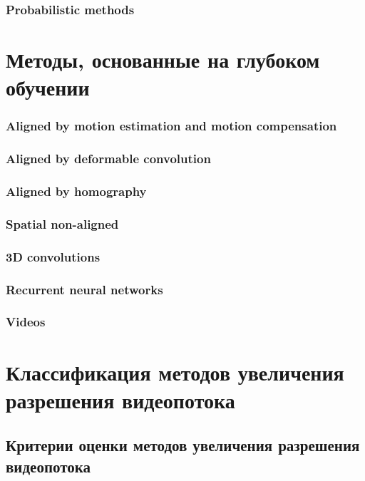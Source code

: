 \documentclass{bmstu}
\begin{document}
\subsection{Probabilistic methods}

\chapter{Методы, основанные на глубоком обучении}

\subsection{Aligned by motion estimation and motion compensation}

\subsection{Aligned by deformable convolution}

\subsection{Aligned by homography}

\subsection{Spatial non-aligned}

\subsection{3D convolutions}

\subsection{Recurrent neural networks}

\subsection{Videos}

\chapter{Классификация методов увеличения разрешения видеопотока}

\section{Критерии оценки методов увеличения разрешения видеопотока}
\end{document}
